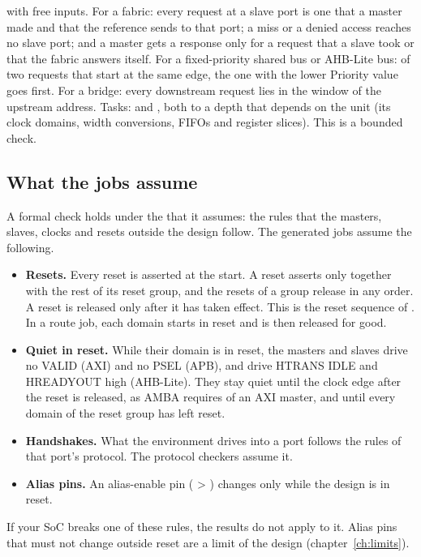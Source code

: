\begin{description}
  with free inputs. For a fabric: every request at a slave port is one that a master made
  and that the reference sends to that port; a miss or a denied access reaches no slave
  port; and a master gets a response only for a request that a slave took or that the
  fabric answers itself. For a fixed-priority shared bus or AHB-Lite bus: of two
  requests that start at the same edge, the one with the lower Priority value goes first.
  For a bridge: every downstream request lies in the window of the upstream address.
  Tasks:  and , both to a depth that depends on the unit (its clock
  domains, width conversions, FIFOs and register slices). This is a bounded check.
\end{description}

\subsection{What the jobs assume}

A formal check holds under the  that it assumes: the rules that the
masters, slaves, clocks and resets outside the design follow. The generated jobs assume
the following.

\begin{itemize}
\item \textbf{Resets.} Every reset is asserted at the start. A reset asserts only together
  with the rest of its reset group, and the resets of a group release in any order. A
  reset is released only after it has taken effect. This is the reset sequence of
  . In a route job, each domain starts in reset and is then released
  for good.
\item \textbf{Quiet in reset.} While their domain is in reset, the masters and slaves
  drive no VALID (AXI) and no PSEL (APB), and drive HTRANS IDLE and HREADYOUT high
  (AHB-Lite). They stay quiet until the clock edge after the reset is released, as AMBA
  requires of an AXI master, and until every domain of the reset group has left reset.
\item \textbf{Handshakes.} What the environment drives into a port follows the rules of
  that port's protocol. The protocol checkers assume it.
\item \textbf{Alias pins.} An alias-enable pin ( > )
  changes only while the design is in reset.
\end{itemize}

If your SoC breaks one of these rules, the results do not apply to it. Alias pins that
must not change outside reset are a limit of the design (chapter~\ref{ch:limits}).

